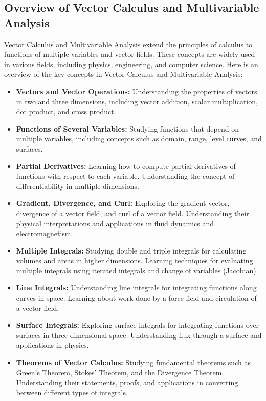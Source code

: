 \documentclass[openany]{book}
\begin{document}
\subsection{Overview of Vector Calculus and Multivariable Analysis}
Vector Calculus and Multivariable Analysis extend the principles of calculus to functions of multiple variables and vector fields. These concepts are widely used in various fields, including physics, engineering, and computer science. Here is an overview of the key concepts in Vector Calculus and Multivariable Analysis:
\begin{itemize}
    \item \textbf{Vectors and Vector Operations:} Understanding the properties of vectors in two and three dimensions, including vector addition, scalar multiplication, dot product, and cross product.
    \item \textbf{Functions of Several Variables:} Studying functions that depend on multiple variables, including concepts such as domain, range, level curves, and surfaces.
    \item \textbf{Partial Derivatives:} Learning how to compute partial derivatives of functions with respect to each variable. Understanding the concept of differentiability in multiple dimensions.
    \item \textbf{Gradient, Divergence, and Curl:} Exploring the gradient vector, divergence of a vector field, and curl of a vector field. Understanding their physical interpretations and applications in fluid dynamics and electromagnetism.
    \item \textbf{Multiple Integrals:} Studying double and triple integrals for calculating volumes and areas in higher dimensions. Learning techniques for evaluating multiple integrals using iterated integrals and change of variables (Jacobian).
    \item \textbf{Line Integrals:} Understanding line integrals for integrating functions along curves in space. Learning about work done by a force field and circulation of a vector field.
    \item \textbf{Surface Integrals:} Exploring surface integrals for integrating functions over surfaces in three-dimensional space. Understanding flux through a surface and applications in physics.
    \item \textbf{Theorems of Vector Calculus:} Studying fundamental theorems such as Green's Theorem, Stokes' Theorem, and the Divergence Theorem. Understanding their statements, proofs, and applications in converting between different types of integrals.

\end{itemize}
\end{document}
